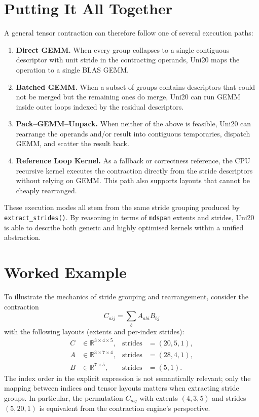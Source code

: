 \documentclass[11pt]{article}
\begin{document}
\section{Putting It All Together}
A general tensor contraction can therefore follow one of several execution paths:
\begin{enumerate}
  \item \textbf{Direct GEMM.}  When every group collapses to a single contiguous descriptor with
        unit stride in the contracting operands, Uni20 maps the operation to a single BLAS GEMM.
  \item \textbf{Batched GEMM.}  When a subset of groups contains descriptors that could not be merged
        but the remaining ones do merge, Uni20 can run GEMM inside outer loops indexed by the residual
        descriptors.
  \item \textbf{Pack--GEMM--Unpack.}  When neither of the above is feasible, Uni20 can rearrange the
        operands and/or result into contiguous temporaries, dispatch GEMM, and scatter the result
        back.
  \item \textbf{Reference Loop Kernel.}  As a fallback or correctness reference, the CPU recursive
        kernel executes the contraction directly from the stride descriptors without relying on
        GEMM.  This path also supports layouts that cannot be cheaply rearranged.
\end{enumerate}
These execution modes all stem from the same stride grouping produced by
\texttt{extract\_strides()}.  By reasoning in terms of \texttt{mdspan} extents and strides, Uni20 is
able to describe both generic and highly optimised kernels within a unified abstraction.

\section{Worked Example}
To illustrate the mechanics of stride grouping and rearrangement, consider the contraction
\begin{equation}
  C_{aij} = \sum_b A_{abi} B_{bj}
\end{equation}
with the following layouts (extents and per-index strides):
\begin{align*}
  C &\in \mathbb{R}^{3 \times 4 \times 5}, &\text{strides}&=(20, 5, 1), \\
  A &\in \mathbb{R}^{3 \times 7 \times 4}, &\text{strides}&=(28, 4, 1), \\
  B &\in \mathbb{R}^{7 \times 5},           &\text{strides}&=(5, 1).
\end{align*}
The index order in the explicit expression is not semantically relevant; only the mapping between
indices and tensor layouts matters when extracting stride groups.  In particular, the permutation
\(C_{iaj}\) with extents \((4, 3, 5)\) and strides \((5, 20, 1)\) is equivalent from the
contraction engine's perspective.
\end{document}
